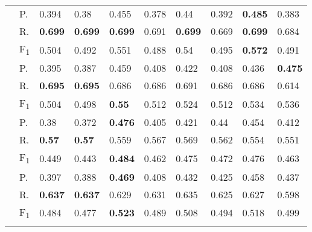 \begin{tabularx}{\textwidth}{p{1.3em}l Z  Z  Z  Z  Z  Z  Z  Z }
    & P.    & 0.394    & 0.38    & 0.455    & 0.378    & 0.44    & 0.392    & \textbf{ 0.485 }    & 0.383 \\
    & R.    & \textbf{ 0.699 }    & \textbf{ 0.699 }    & \textbf{ 0.699 }    & 0.691    & \textbf{ 0.699 }    & 0.669    & \textbf{ 0.699 }    & 0.684 \\
    & F\textsubscript{1}    & 0.504    & 0.492    & 0.551    & 0.488    & 0.54    & 0.495    & \textbf{ 0.572 }    & 0.491 \\
     \midrule {}

    & P.    & 0.395    & 0.387    & 0.459    & 0.408    & 0.422    & 0.408    & 0.436    & \textbf{ 0.475 } \\
    & R.    & \textbf{ 0.695 }    & \textbf{ 0.695 }    & 0.686    & 0.686    & 0.691    & 0.686    & 0.686    & 0.614 \\
    & F\textsubscript{1}    & 0.504    & 0.498    & \textbf{ 0.55 }    & 0.512    & 0.524    & 0.512    & 0.534    & 0.536 \\
     \midrule {}

    & P.    & 0.38    & 0.372    & \textbf{ 0.476 }    & 0.405    & 0.421    & 0.44    & 0.454    & 0.412 \\
    & R.    & \textbf{ 0.57 }    & \textbf{ 0.57 }    & 0.559    & 0.567    & 0.569    & 0.562    & 0.554    & 0.551 \\
    & F\textsubscript{1}    & 0.449    & 0.443    & \textbf{ 0.484 }    & 0.462    & 0.475    & 0.472    & 0.476    & 0.463 \\
     \midrule {}

    & P.    & 0.397    & 0.388    & \textbf{ 0.469 }    & 0.408    & 0.432    & 0.425    & 0.458    & 0.437 \\
    & R.    & \textbf{ 0.637 }    & \textbf{ 0.637 }    & 0.629    & 0.631    & 0.635    & 0.625    & 0.627    & 0.598 \\
    & F\textsubscript{1}    & 0.484    & 0.477    & \textbf{ 0.523 }    & 0.489    & 0.508    & 0.494    & 0.518    & 0.499 \\
     \midrule {}

\end{tabularx}